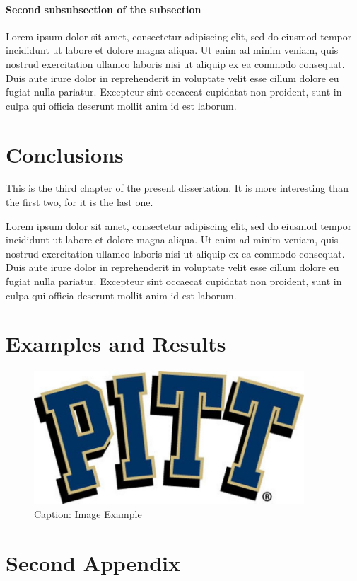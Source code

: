 \documentclass[phd]{pittetd}
\begin{document}
\subsubsection{Second subsubsection of the subsection}
Lorem ipsum dolor sit amet, consectetur adipiscing elit, sed do eiusmod tempor incididunt ut labore
et dolore magna aliqua.\cite{DUMMY:3}
Ut enim ad minim veniam, quis nostrud exercitation ullamco laboris nisi ut aliquip ex ea commodo
consequat.
Duis aute irure dolor in reprehenderit in voluptate velit esse cillum dolore eu fugiat nulla
pariatur.\cite{DUMMY:4}
Excepteur sint occaecat cupidatat non proident, sunt in culpa qui officia deserunt mollit anim id
est laborum.\cite{DUMMY:5}


\chapter{Conclusions}
This is the third chapter of the present dissertation.\cite{DUMMY:6}
It is more interesting than the first two, for it is the last one.\cite{DUMMY:7}

Lorem ipsum dolor sit amet, consectetur adipiscing elit, sed do eiusmod tempor incididunt ut labore
et dolore magna aliqua.\cite{DUMMY:8}
Ut enim ad minim veniam, quis nostrud exercitation ullamco laboris nisi ut aliquip ex ea commodo
consequat.\cite{DUMMY:9}
Duis aute irure dolor in reprehenderit in voluptate velit esse cillum dolore eu fugiat nulla
pariatur.\cite{DUMMY:10}
Excepteur sint occaecat cupidatat non proident, sunt in culpa qui officia deserunt mollit anim id
est laborum.


\appendix %

\chapter{Examples and Results}
\begin{figure}[t]
    \centering
    \includegraphics[width=0.9\textwidth]{Images/Picture-Example.jpg}
    \caption{Caption: Image Example}
    \label{Reference: Picture Example}
\end{figure}

\chapter{Second Appendix}



\end{document}
